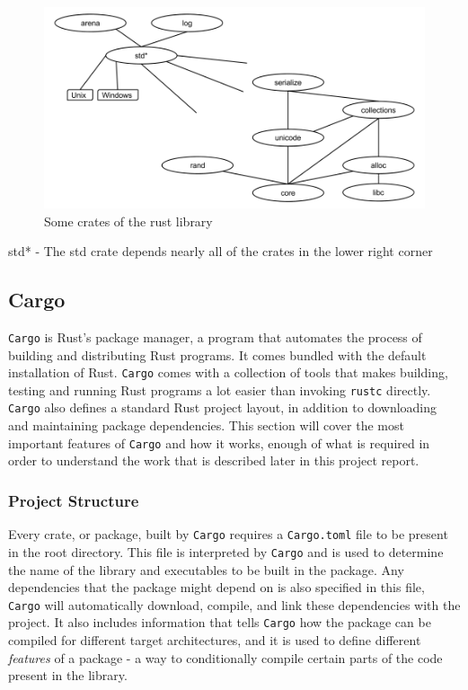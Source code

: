\begin{figure}[H]
  \begin{center}
    \includegraphics[scale=0.3]{figures/background/rust/rust-lib.png}
  \end{center}
  \caption{Some crates of the rust library}
  \label{fig:rust:librust}
\end{figure}
std* - The std crate depends nearly all of the crates in the lower right corner

\subsection{Cargo}
\label{sec:cargo}

\texttt{Cargo} is Rust's package manager, a program that automates the process of building and distributing Rust programs.
It comes bundled with the default installation of Rust.
\texttt{Cargo} comes with a collection of tools that makes building, testing and running Rust programs a lot easier than invoking \texttt{rustc} directly.
\texttt{Cargo} also defines a standard Rust project layout, in addition to downloading and maintaining package dependencies.
This section will cover the most important features of \texttt{Cargo} and how it works, enough of what is required in order to understand the work that is described later in this project report.

\subsubsection{Project Structure}

Every crate, or package, built by \texttt{Cargo} requires a \texttt{Cargo.toml} file to be present in the root directory.
This file is interpreted by \texttt{Cargo} and is used to determine the name of the library and executables to be built in the package.
Any dependencies that the package might depend on is also specified in this file, \texttt{Cargo} will automatically download, compile, and link these dependencies with the project.
It also includes information that tells \texttt{Cargo} how the package can be compiled for different target architectures, and it is used to define different \textit{features} of a package - a way to conditionally compile certain parts of the code present in the library.

